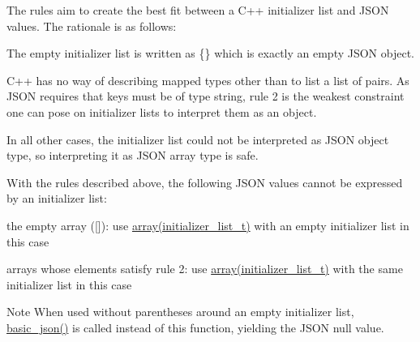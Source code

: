 The rules aim to create the best fit between a C++ initializer list and J\+S\+ON values. The rationale is as follows\+:


\begin{DoxyEnumerate}
\item The empty initializer list is written as {\ttfamily \{\}} which is exactly an empty J\+S\+ON object.
\item C++ has no way of describing mapped types other than to list a list of pairs. As J\+S\+ON requires that keys must be of type string, rule 2 is the weakest constraint one can pose on initializer lists to interpret them as an object.
\item In all other cases, the initializer list could not be interpreted as J\+S\+ON object type, so interpreting it as J\+S\+ON array type is safe.
\end{DoxyEnumerate}

With the rules described above, the following J\+S\+ON values cannot be expressed by an initializer list\+:


\begin{DoxyItemize}
\item the empty array ({\ttfamily \mbox{[}\mbox{]}})\+: use \hyperlink{classnlohmann_1_1basic__json_a8a7d537fc297bbc5b845f92fe0445e3b}{array(initializer\+\_\+list\+\_\+t)} with an empty initializer list in this case
\item arrays whose elements satisfy rule 2\+: use \hyperlink{classnlohmann_1_1basic__json_a8a7d537fc297bbc5b845f92fe0445e3b}{array(initializer\+\_\+list\+\_\+t)} with the same initializer list in this case
\end{DoxyItemize}

\begin{DoxyNote}{Note}
When used without parentheses around an empty initializer list, \hyperlink{classnlohmann_1_1basic__json_aed115142bd0c6c66c864700e0467df55}{basic\+\_\+json()} is called instead of this function, yielding the J\+S\+ON null value.
\end{DoxyNote}

